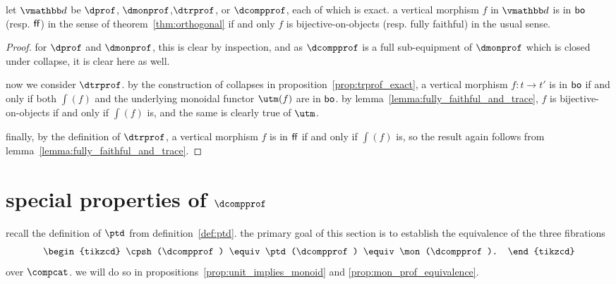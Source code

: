 \documentclass[11pt,oneside,article]{memoir}
\begin{document}
\begin{proposition}\label{prop:boff_well_named}
   let $\dcat{d}$ be $\dprof$, $\dmonprof$,$\dtrprof$, or $\dcompprof$, each of which is exact. a vertical morphism
   $f$ in $\dcat{d}$ is in $\mathsf{bo}$ (resp. $\mathsf{ff}$) in the sense of theorem~\ref{thm:orthogonal} if and only
   $f$ is bijective-on-objects (resp. fully faithful) in the usual sense.
\end{proposition}
\begin{proof}
   for $\dprof$ and $\dmonprof$, this is clear by inspection, and as $\dcompprof$ is a full sub-equipment of
   $\dmonprof$ which is closed under collapse, it is clear here as well.

   now we consider $\dtrprof$. by the construction of collapses in
   proposition~\ref{prop:trprof_exact}, a vertical morphism $f\colon t\to t'$ is in $\mathsf{bo}$ if and
   only if both $\int(f)$ and the underlying monoidal functor $\utm(f)$ are in $\mathsf{bo}$. by
   lemma~\ref{lemma:fully_faithful_and_trace}, $f$ is bijective-on-objects if and only if $\int(f)$
   is, and the same is clearly true of $\utm$.

   finally, by the definition of $\dtrprof$, a vertical morphism $f$ is in $\mathsf{ff}$ if and only if
   $\int(f)$ is, so the result again follows from lemma~\ref{lemma:fully_faithful_and_trace}.
\end{proof}



\section{special properties of $\dcompprof$}\label{sec:special_compprof}

recall the definition of $\ptd$ from definition~\ref{def:ptd}. the primary goal of this section is
to establish the equivalence of the three fibrations
\begin{equation}\label{eqn:primary_goal}
   \begin{tikzcd}
      \cpsh(\dcompprof) \equiv \ptd(\dcompprof) \equiv \mon(\dcompprof).
   \end{tikzcd}
\end{equation}
over $\compcat$. we will do so in propositions~\ref{prop:unit_implies_monoid} and
\ref{prop:mon_prof_equivalence}.
\end{document}
